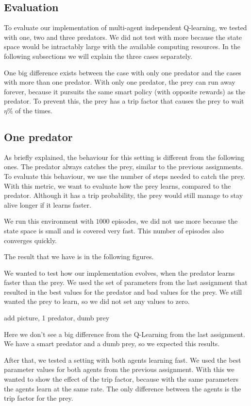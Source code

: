 \documentclass{article}
\begin{document}
\subsection{Evaluation}
To evaluate our implementation of multi-agent independent Q-learning, we tested
with one, two and three predators. We did not test with more because the state
space would be intractably large with the available computing resources. In the
following subsections we will explain the three cases separately.

One big difference exists between the case with only one predator and the cases with
more than one predator. With only one predator, the prey can run away forever, because it pursuits the same smart policy (with opposite rewards) as the predator. To prevent this, the prey has a trip factor that causes the
prey to wait $\eta\%$ of the times.

\subsection{One predator}
As briefly explained, the behaviour for this setting is different from the
following ones. The predator always catches the prey, similar to the previous
assignments. To evaluate this behaviour, we use the number of steps needed to
catch the prey. With this metric, we want to evaluate how the prey learns, compared to
the predator. Although it has a trip probability, the prey would still manage to
stay alive longer if it learns faster.

We run this environment with $1000$ episodes, we did not use more because the
state space is small and is covered very fast. This number of episodes also converges quickly.

The result that we have is in the following figures.

We wanted to test how our implementation evolves, when the predator learns faster than the prey. We
used the set of parameters from the last assignment that resulted in the best values for the predator and bad values for the prey. We still wanted the
prey to learn, so we did not set any values to zero.

\error add picture, 1 predator, dumb prey

Here we don't see a big difference from the Q-Learning from the last assignment.
We have a smart predator and a dumb prey, so we expected this results.

After that, we tested a setting with both agents learning fast. We used the best parameter values for both agents from the previous assignment. With this we wanted to show the effect
of the trip factor, because with the same parameters the agents learn at the same rate.
The only difference between the agents is the trip factor for the prey.
\end{document}
